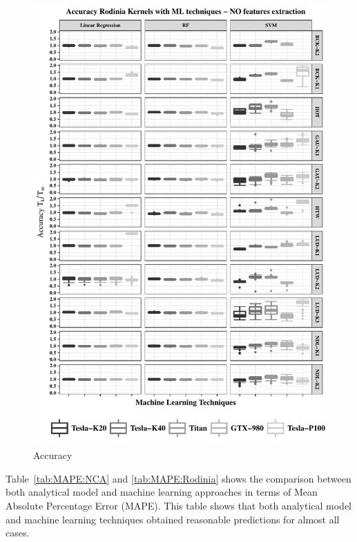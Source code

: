 \begin{figure}[htpb]
    \centering
    \includegraphics[scale=1]{images/ResultTechniques-Rodinia-fair.pdf}
    \caption{Accuracy}
    \label{fig:Results-RodiniaFair}
\end{figure}

Table~\ref{tab:MAPE:NCA} and \ref{tab:MAPE:Rodinia} shows the comparison between both analytical model and machine learning approaches in terms of Mean Absolute Percentage Error (MAPE). This table shows that both analytical model and machine learning techniques obtained reasonable predictions for almost all cases. 


